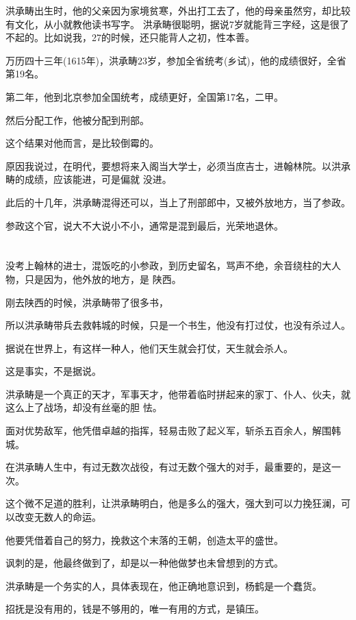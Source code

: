 \documentclass[11pt,a4paper,onecolumn]{article}
\begin{document}
洪承畴出生时，他的父亲因为家境贫寒，外出打工去了，他的母亲虽然穷，却比较有文化，从小就教他读书写字。
洪承畴很聪明，据说7岁就能背三字经，这是很了不起的。比如说我，27的时候，还只能背人之初，性本善。

万历四十三年(1615年)，洪承畴23岁，参加全省统考(乡试)，他的成绩很好，全省第19名。

第二年，他到北京参加全国统考，成绩更好，全国第17名，二甲。

然后分配工作，他被分配到刑部。

这个结果对他而言，是比较倒霉的。

原因我说过，在明代，要想将来入阁当大学士，必须当庶吉士，进翰林院。以洪承畴的成绩，应该能进，可是偏就
没进。

此后的十几年，洪承畴混得还可以，当上了刑部郎中，又被外放地方，当了参政。

参政这个官，说大不大说小不小，通常是混到最后，光荣地退休。

\section[\thesection]{}

没考上翰林的进士，混饭吃的小参政，到历史留名，骂声不绝，余音绕柱的大人物，只是因为，他外放的地方，是
陕西。

刚去陕西的时候，洪承畴带了很多书，

所以洪承畴带兵去救韩城的时候，只是一个书生，他没有打过仗，也没有杀过人。

据说在世界上，有这样一种人，他们天生就会打仗，天生就会杀人。

这是事实，不是据说。

洪承畴是一个真正的天才，军事天才，他带着临时拼起来的家丁、仆人、伙夫，就这么上了战场，却没有丝毫的胆
怯。

面对优势敌军，他凭借卓越的指挥，轻易击败了起义军，斩杀五百余人，解围韩城。

在洪承畴人生中，有过无数次战役，有过无数个强大的对手，最重要的，是这一次。

这个微不足道的胜利，让洪承畴明白，他是多么的强大，强大到可以力挽狂澜，可以改变无数人的命运。

他要凭借着自己的努力，挽救这个末落的王朝，创造太平的盛世。

讽刺的是，他最终做到了，却是以一种他做梦也未曾想到的方式。

洪承畴是一个务实的人，具体表现在，他正确地意识到，杨鹤是一个蠢货。

招抚是没有用的，钱是不够用的，唯一有用的方式，是镇压。
\end{document}
